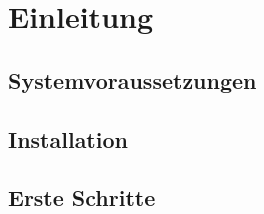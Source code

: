 
\chapter{Einleitung}

\section{Systemvoraussetzungen}

\section{Installation}

\section{Erste Schritte}




